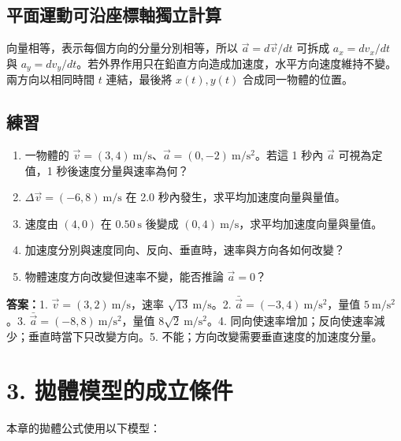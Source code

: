 \documentclass[11pt,a4paper]{article}
\providecommand{\tightlist}{%
  \setlength{\itemsep}{0pt}\setlength{\parskip}{0pt}}
\begin{document}
\subsection{平面運動可沿座標軸獨立計算}\label{ux5e73ux9762ux904bux52d5ux53efux6cbfux5ea7ux6a19ux8ef8ux7368ux7acbux8a08ux7b97}

向量相等，表示每個方向的分量分別相等，所以 \(\vec a=d\vec v/dt\) 可拆成 \(a_x=dv_x/dt\) 與 \(a_y=dv_y/dt\)。若外界作用只在鉛直方向造成加速度，水平方向速度維持不變。兩方向以相同時間 \(t\) 連結，最後將 \(x(t),y(t)\) 合成同一物體的位置。

\begin{HandoutSelfCheck}

\subsection{練習}\label{ux7df4ux7fd2-2}

\begin{enumerate}
\def\labelenumi{\arabic{enumi}.}
\tightlist
\item
  一物體的 \(\vec v=(3,4)\ \mathrm{m/s}\)、\(\vec a=(0,-2)\ \mathrm{m/s^2}\)。若這 1 秒內 \(\vec a\) 可視為定值，1 秒後速度分量與速率為何？
\item
  \(\Delta\vec v=(-6,8)\ \mathrm{m/s}\) 在 2.0 秒內發生，求平均加速度向量與量值。
\item
  速度由 \((4,0)\) 在 \(0.50\ \mathrm s\) 後變成 \((0,4)\ \mathrm{m/s}\)，求平均加速度向量與量值。
\item
  加速度分別與速度同向、反向、垂直時，速率與方向各如何改變？
\item
  物體速度方向改變但速率不變，能否推論 \(\vec a=0\)？
\end{enumerate}

\textbf{答案：}1. \(\vec v=(3,2)\ \mathrm{m/s}\)，速率 \(\sqrt{13}\ \mathrm{m/s}\)。2. \(\bar{\vec a}=(-3,4)\ \mathrm{m/s^2}\)，量值 \(5\ \mathrm{m/s^2}\)。3. \(\bar{\vec a}=(-8,8)\ \mathrm{m/s^2}\)，量值 \(8\sqrt2\ \mathrm{m/s^2}\)。4. 同向使速率增加；反向使速率減少；垂直時當下只改變方向。5. 不能；方向改變需要垂直速度的加速度分量。

\end{HandoutSelfCheck}

\section{3. 拋體模型的成立條件}\label{ux62cbux9ad4ux6a21ux578bux7684ux6210ux7acbux689dux4ef6}

本章的拋體公式使用以下模型：
\end{document}
